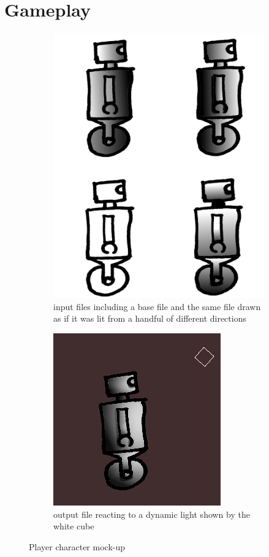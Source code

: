 \section{Gameplay}


\begin{figure}[ht]
\centering
\begin{subfigure}{.5\textwidth}
  \centering
  \includegraphics[scale=0.2, trim = 0cm 0cm 0cm 2cm]{images/in}
  \caption{input files including a base file and the same file drawn as if it was lit from a handful of different directions}
  \label{fig:sub1:pl}
\end{subfigure}%
\begin{subfigure}{.5\textwidth}
  \centering
  \includegraphics[scale=0.9, trim = 0cm 0cm 0cm 0.5cm]{images/out}	
  \caption{output file reacting to a dynamic light shown by the white cube}
  \label{fig:sub2:pl}
\end{subfigure}
\caption{Player character mock-up}
\label{fig:player}
\end{figure}


